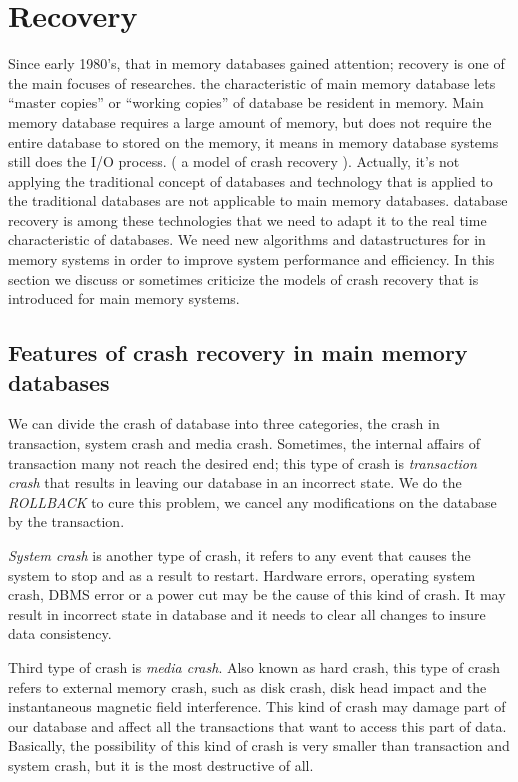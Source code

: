 \documentclass[10pt]{article} %
\begin{document}

\section{Recovery}

Since early 1980’s, that in memory databases gained attention; recovery is one of the main focuses of researches.  the characteristic of main memory database lets “master copies” or “working copies” of database be resident in memory. Main memory database requires a large amount of memory, but does not require the entire database to stored on the memory, it means in memory database systems still does the I/O process. ( a model of crash recovery ). Actually, it’s not applying the traditional concept of databases and technology that is applied to the traditional databases are not applicable to main memory databases. database recovery is among these technologies that we need to adapt it to the real time characteristic of databases. We need new algorithms and datastructures for in memory systems in order to improve system performance and efficiency. In this section we discuss or sometimes criticize the models of crash recovery that is introduced for main memory systems.

\subsection{Features of crash recovery in main memory databases}

We can divide the crash of database into three categories, the crash in transaction, system crash and media crash. Sometimes, the internal affairs of transaction many not reach the desired end; this type of crash is \emph{transaction crash} that results in leaving our database in an incorrect state. We do the \emph{ROLLBACK} to cure this problem, we cancel any modifications on the database by the transaction.

\emph{System crash} is another type of crash, it refers to any event that causes the system to stop and as a result to restart. Hardware errors, operating system crash, DBMS error  or a power cut may be the cause of this kind of crash. It may result in incorrect state in database and it needs to clear all changes to insure data consistency.

Third type of crash is \emph{media crash}. Also known as hard crash, this type of crash refers to external memory crash, such as disk crash, disk head impact and the instantaneous magnetic field interference. This kind of crash may damage part of our database and affect all the transactions that want to access this part of data. Basically, the possibility of this kind of crash is very smaller than transaction and system crash, but it is the most destructive of all.
\end{document}
